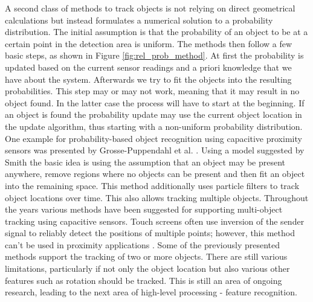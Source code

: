 A second class of methods to track objects is not relying on direct geometrical calculations but instead formulates a numerical solution to a probability distribution. The initial assumption is that the probability of an object to be at a certain point in the detection area is uniform. The methods then follow a few basic steps, as shown in Figure \ref{fig:rel_prob_method}. At first the probability is updated based on the current sensor readings and a priori knowledge that we have about the system. Afterwards we try to fit the objects into the resulting probabilities. This step may or may not work, meaning that it may result in no object found. In the latter case the process will have to start at the beginning. If an object is found the probability update may use the current object location in the update algorithm, thus starting with a non-uniform probability distribution.
One example for probability-based object recognition using capacitive proximity sensors was presented by Grosse-Puppendahl et al. \cite{grosse2013swiss}. Using a model suggested by Smith the basic idea is using the assumption that an object may be present anywhere, remove regions where no objects can be present and then fit an object into the remaining space. This method additionally uses particle filters to track object locations over time. This also allows tracking multiple objects. 
Throughout the years various methods have been suggested for supporting multi-object tracking using capacitive sensors. Touch screens often use inversion of the sender signal to reliably detect the positions of multiple points; however, this method can’t be used in proximity applications \cite{wilson2007}. Some of the previously presented methods support the tracking of two or more objects. There are still various limitations, particularly if not only the object location but also various other features such as rotation should be tracked. This is still an area of ongoing research, leading to the next area of high-level processing - feature recognition.

